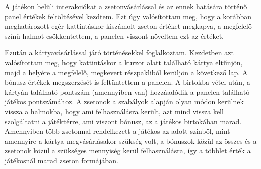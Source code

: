 A játékon belüli interakciókat a zsetonvásárlással és az ennek hatására történő panel értékek feltöltésével kezdtem. Ezt úgy valósítottam meg, hogy a korábban meghatározott egér kattintáskor kiszámolt zseton értéket megkapva, a megfelelő színű halmot csökkentettem, a panelen viszont növeltem ezt az értéket.\par
Ezután a kártyavásárlással járó történésekkel foglalkoztam. Kezdetben azt valósítottam meg, hogy kattintáskor a kurzor alatt található kártya eltűnjön, majd a helyére a megfelelő, megkevert részpakliból kerüljön a következő lap. A bónusz értékek megszerzését is feltüntettem a panelen. A birtokba vétel után, a kártyán található pontszám (amennyiben van) hozzáadódik a panelen található játékos pontszámához. A zsetonok a szabályok alapján olyan módon kerülnek vissza a halmokba, hogy ami felhasználásra került, azt mind vissza kell szolgáltatni a játéktérre, ami viszont bónusz, az a játékos birtokában marad. Amennyiben több zsetonnal rendelkezett a játékos az adott színből, mint amennyire a kártya megvásárlásakor szükség volt, a bónuszok közül az összes és a zsetonok közül a szükséges mennyiség kerül felhasználásra, így a többlet érték a játékosnál marad zseton formájában.


